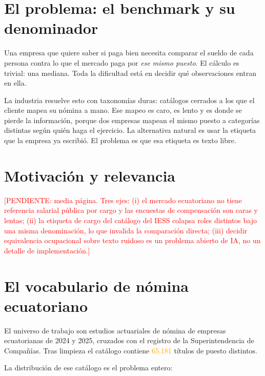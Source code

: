 \documentclass[12pt,a4paper,oneside]{report}
\newcommand{\pend}[1]{\textcolor{red}{\small[PENDIENTE: #1]}}
\newcommand{\verificar}[1]{\textcolor{orange}{#1}}
\begin{document}
\section{El problema: el benchmark y su denominador}

Una empresa que quiere saber si paga bien necesita comparar el sueldo de cada persona
contra lo que el mercado paga por \emph{ese mismo puesto}. El cálculo es trivial: una
mediana. Toda la dificultad está en decidir qué observaciones entran en ella.

La industria resuelve esto con taxonomías duras: catálogos cerrados a los que el cliente
mapea su nómina a mano. Ese mapeo es caro, es lento y es donde se pierde la información,
porque dos empresas mapean el mismo puesto a categorías distintas según quién haga el
ejercicio. La alternativa natural es usar la etiqueta que la empresa ya escribió. El
problema es que esa etiqueta es texto libre.

\section{Motivación y relevancia}

\pend{media página. Tres ejes: (i) el mercado ecuatoriano no tiene referencia salarial
pública por cargo y las encuestas de compensación son caras y lentas; (ii) la etiqueta de
cargo del catálogo del IESS colapsa roles distintos bajo una misma denominación, lo que
invalida la comparación directa; (iii) decidir equivalencia ocupacional sobre texto
ruidoso es un problema abierto de IA, no un detalle de implementación.}

\section{El vocabulario de nómina ecuatoriano}

El universo de trabajo son estudios actuariales de nómina de empresas ecuatorianas de
2024 y 2025, cruzados con el registro de la Superintendencia de Compañías. Tras limpieza
el catálogo contiene \verificar{65.181} títulos de puesto distintos.

La distribución de ese catálogo es el problema entero:
\end{document}
